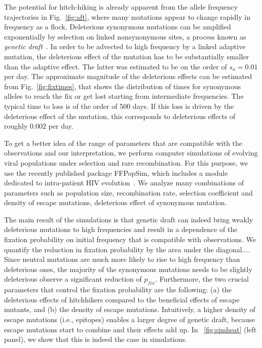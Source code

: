 \documentclass[rmp, twocolumn]{revtex4}
\newcommand{\FIG}[1]{Fig.~\ref{fig:#1}}
\begin{document}
The potential for hitch-hiking is already apparent from the allele frequency trajectories in \FIG{aft}, where many mutations appear to change rapidly in frequency as a flock. Deleterious synonymous mutations can be amplified exponentially by selection on linked nonsynonymous sites, a process known as {\it genetic draft}~\citep{neher_genetic_2011}. In order to be advected to high frequency by a linked adaptive mutation, the deleterious effect of the mutation has to be substantially smaller than the adaptive effect. The latter was estimated to be on the order of $s_a = 0.01$ per day. The approximate magnitude of the deleterious effects can be estimated from \FIG{fixtimes}, that shows the distribution of times for synonymous alleles to reach the fix or get lost starting from intermediate frequencies. The typical time to loss is of the order of 500 days. If this loss is driven by the deleterious effect of the mutation, this corresponds to deleterious effects of roughly $0.002$ per day.

To get a better idea of the range of parameters that are compatible with the observations and our interpretation, we  perform computer simulations of evolving viral populations under selection and rare recombination. For this purpose, we use the recently published package FFPopSim, which includes a module dedicated to intra-patient
HIV evolution~\citep{zanini_ffpopsim:_2012}. We analyze many combinations of
parameters such as population size, recombination rate, selection coefficient
and density of escape mutations, deleterious effect of synonymous mutation.

The main result of the simulations is that genetic draft can indeed bring weakly deleterious mutations to high frequencies and result in a dependence of the fixation probability on initial frequency that is compatible with observations. We quantify the reduction in fixation probability by the area under the diagonal.... Since neutral mutations are much more likely to rise to high frequency than deleterious ones, the majority of the synonymous mutations needs to be slightly deleterious observe a significant reduction of $p_{fix}$. Furthermore, the two crucial parameters that control the fixation probability
are the following: (a) the deleterious effects of hitchhikers compared to
the beneficial effects of escape mutants, and (b) the density of escape
mutations. Intuitively, a higher density of escape mutations (i.e., epitopes)
enables a larger degree of genetic draft, because escape mutations start to
combine and their effects add up. In \figurename~\ref{fig:simheat} (left panel),
we show that this is indeed the case in simulations.
\end{document}
